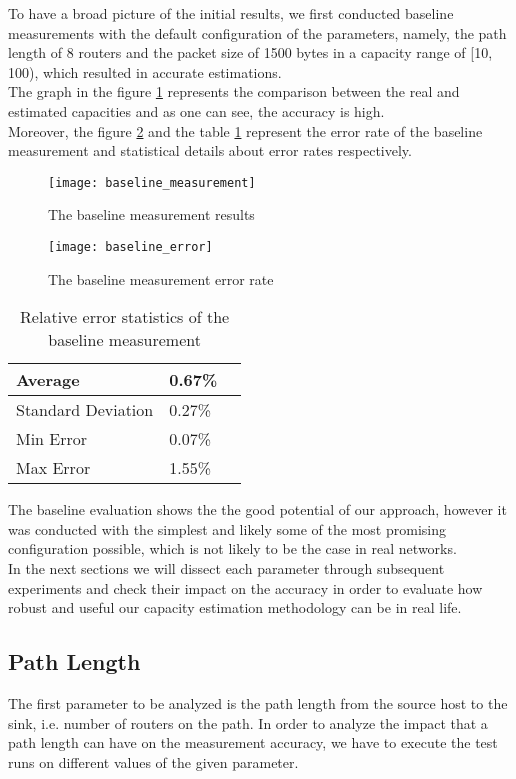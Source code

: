 To have a broad picture of the initial results, we first conducted baseline measurements with the default configuration of the parameters, namely, the path length of 8 routers and the packet size of 1500 bytes in a capacity range of [10, 100), which resulted in accurate estimations. 
\\The graph in the figure \ref{baseline} represents the comparison between the real and estimated capacities and as one can see, the accuracy is high.\\
Moreover, the figure \ref{baseline_error} and the table \ref{baseline_error_stats} represent the error rate of the baseline measurement and statistical details about error rates respectively.

\begin{figure}[H]
 \centering
 \texttt{[image: baseline\_measurement]}
 \caption{The baseline measurement results}
 \label{baseline}
\end{figure}

\begin{figure}[H]
 \centering
 \texttt{[image: baseline\_error]}
 \caption{The baseline measurement error rate}
 \label{baseline_error}
\end{figure}

\begin{table}[H]
\centering
\begin{tabular}{ | m{11em} | m{1cm}| m{2cm} | } 
  \hline
  Average & 0.67\% \\ 
  \hline
  Standard Deviation & 0.27\% \\ 
  \hline
  Min Error & 0.07\% \\ 
  \hline
  Max Error & 1.55\% \\ 
  \hline
\end{tabular}
\caption{Relative error statistics of the baseline measurement}
\label{baseline_error_stats}
\end{table}

The baseline evaluation shows the the good potential of our approach, however it was conducted with the simplest and likely some of the most promising configuration possible, which is not likely to be the case in real networks.\\
In the next sections we will dissect each parameter through subsequent experiments and check their impact on the accuracy in order to evaluate how robust and useful our capacity estimation methodology can be in real life.  

\subsection{Path Length}
The first parameter to be analyzed is the path length from the source host to the sink, i.e. number of routers on the path. In order to analyze the impact that a path length can have on the measurement accuracy, we have to execute the test runs on different values of the given parameter. 

